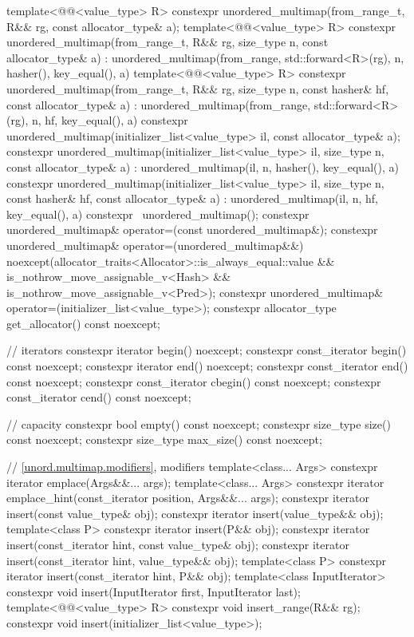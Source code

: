 \begin{codeblock}
{{    template<@@<value_type> R>
      constexpr unordered_multimap(from_range_t, R&& rg, const allocator_type& a);
    template<@@<value_type> R>
      constexpr unordered_multimap(from_range_t, R&& rg, size_type n, const allocator_type& a)
        : unordered_multimap(from_range, std::forward<R>(rg),
                             n, hasher(), key_equal(), a) { }
    template<@@<value_type> R>
      constexpr unordered_multimap(from_range_t, R&& rg, size_type n, const hasher& hf,
                                   const allocator_type& a)
        : unordered_multimap(from_range, std::forward<R>(rg), n, hf, key_equal(), a) { }
    constexpr unordered_multimap(initializer_list<value_type> il, const allocator_type& a);
    constexpr unordered_multimap(initializer_list<value_type> il, size_type n,
                                 const allocator_type& a)
      : unordered_multimap(il, n, hasher(), key_equal(), a) { }
    constexpr unordered_multimap(initializer_list<value_type> il, size_type n, const hasher& hf,
                                 const allocator_type& a)
      : unordered_multimap(il, n, hf, key_equal(), a) { }
    constexpr ~unordered_multimap();
    constexpr unordered_multimap& operator=(const unordered_multimap&);
    constexpr unordered_multimap& operator=(unordered_multimap&&)
      noexcept(allocator_traits<Allocator>::is_always_equal::value &&
               is_nothrow_move_assignable_v<Hash> && is_nothrow_move_assignable_v<Pred>);
    constexpr unordered_multimap& operator=(initializer_list<value_type>);
    constexpr allocator_type get_allocator() const noexcept;

    // iterators
    constexpr iterator       begin() noexcept;
    constexpr const_iterator begin() const noexcept;
    constexpr iterator       end() noexcept;
    constexpr const_iterator end() const noexcept;
    constexpr const_iterator cbegin() const noexcept;
    constexpr const_iterator cend() const noexcept;

    // capacity
    constexpr bool empty() const noexcept;
    constexpr size_type size() const noexcept;
    constexpr size_type max_size() const noexcept;

    // \ref{unord.multimap.modifiers}, modifiers
    template<class... Args> constexpr iterator emplace(Args&&... args);
    template<class... Args>
      constexpr iterator emplace_hint(const_iterator position, Args&&... args);
    constexpr iterator insert(const value_type& obj);
    constexpr iterator insert(value_type&& obj);
    template<class P> constexpr iterator insert(P&& obj);
    constexpr iterator insert(const_iterator hint, const value_type& obj);
    constexpr iterator insert(const_iterator hint, value_type&& obj);
    template<class P> constexpr iterator insert(const_iterator hint, P&& obj);
    template<class InputIterator> constexpr void insert(InputIterator first, InputIterator last);
    template<@@<value_type> R>
      constexpr void insert_range(R&& rg);
    constexpr void insert(initializer_list<value_type>);

}}
\end{codeblock}
